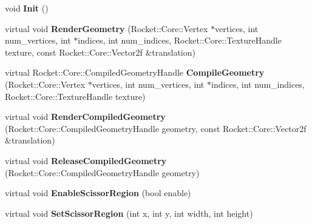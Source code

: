\begin{DoxyCompactItemize}
\item 
\hypertarget{classRocketRenderInterface_afdde193e6932386acde6f16ecc4d625f}{void {\bfseries \-Init} ()}\label{classRocketRenderInterface_afdde193e6932386acde6f16ecc4d625f}

\item 
\hypertarget{classRocketRenderInterface_ac4b6342fe7756264b3982ac5a6d7b911}{virtual void {\bfseries \-Render\-Geometry} (\-Rocket\-::\-Core\-::\-Vertex $\ast$vertices, int num\-\_\-vertices, int $\ast$indices, int num\-\_\-indices, \-Rocket\-::\-Core\-::\-Texture\-Handle texture, const \-Rocket\-::\-Core\-::\-Vector2f \&translation)}\label{classRocketRenderInterface_ac4b6342fe7756264b3982ac5a6d7b911}

\item 
\hypertarget{classRocketRenderInterface_a17e65e48bb5cd5fe151f9a2b4fa0e842}{virtual \*
\-Rocket\-::\-Core\-::\-Compiled\-Geometry\-Handle {\bfseries \-Compile\-Geometry} (\-Rocket\-::\-Core\-::\-Vertex $\ast$vertices, int num\-\_\-vertices, int $\ast$indices, int num\-\_\-indices, \-Rocket\-::\-Core\-::\-Texture\-Handle texture)}\label{classRocketRenderInterface_a17e65e48bb5cd5fe151f9a2b4fa0e842}

\item 
\hypertarget{classRocketRenderInterface_a152c0ccbe1817c1d009916b0cda5b539}{virtual void {\bfseries \-Render\-Compiled\-Geometry} (\-Rocket\-::\-Core\-::\-Compiled\-Geometry\-Handle geometry, const \-Rocket\-::\-Core\-::\-Vector2f \&translation)}\label{classRocketRenderInterface_a152c0ccbe1817c1d009916b0cda5b539}

\item 
\hypertarget{classRocketRenderInterface_a321b48fdf97bec9ccbb2060ffb0efa7b}{virtual void {\bfseries \-Release\-Compiled\-Geometry} (\-Rocket\-::\-Core\-::\-Compiled\-Geometry\-Handle geometry)}\label{classRocketRenderInterface_a321b48fdf97bec9ccbb2060ffb0efa7b}

\item 
\hypertarget{classRocketRenderInterface_a577eb5b0caf206a2abb30768e74d2471}{virtual void {\bfseries \-Enable\-Scissor\-Region} (bool enable)}\label{classRocketRenderInterface_a577eb5b0caf206a2abb30768e74d2471}

\item 
\hypertarget{classRocketRenderInterface_a6f30811d0e20fd2321b8dd46ee1aa97e}{virtual void {\bfseries \-Set\-Scissor\-Region} (int x, int y, int width, int height)}\label{classRocketRenderInterface_a6f30811d0e20fd2321b8dd46ee1aa97e}


\end{DoxyCompactItemize}
